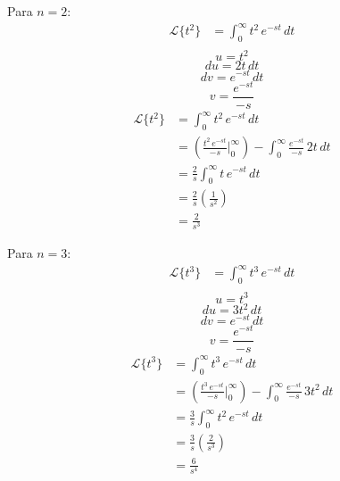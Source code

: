 Para $n=2$:
\begin{equation*}
\begin{split}
    \mathcal{L}\{t^2\}
        &=\int_0^{\infty}t^2\,e^{-st}\,dt\\
\end{split}
\end{equation*}
\begin{equation*}
    u=t^2
\end{equation*}
\begin{equation*}
    du=2t\,dt
\end{equation*}
\begin{equation*}
    dv=e^{-st}\,dt
\end{equation*}
\begin{equation*}
    v=\frac{e^{-st}}{-s}
\end{equation*}
\begin{equation*}
\begin{split}
    \mathcal{L}\{t^2\}
        &=\int_0^{\infty}t^2\,e^{-st}\,dt\\
        &=\left(\frac{t^2\,e^{-st}}{-s}\Biggr|_0^{\infty}\right)
        -\int_0^{\infty}\frac{e^{-st}}{-s}\,2t\,dt\\
        &=\frac{2}{s}\int_0^{\infty}t\,e^{-st}\,dt\\
        &=\frac{2}{s}\left(\frac{1}{s^2}\right)\\
        &=\frac{2}{s^3}
\end{split}
\end{equation*}

Para $n=3$:
\begin{equation*}
\begin{split}
    \mathcal{L}\{t^3\}
        &=\int_0^{\infty}t^3\,e^{-st}\,dt\\
\end{split}
\end{equation*}
\begin{equation*}
    u=t^3
\end{equation*}
\begin{equation*}
    du=3t^2\,dt
\end{equation*}
\begin{equation*}
    dv=e^{-st}\,dt
\end{equation*}
\begin{equation*}
    v=\frac{e^{-st}}{-s}
\end{equation*}
\begin{equation*}
\begin{split}
    \mathcal{L}\{t^3\}
        &=\int_0^{\infty}t^3\,e^{-st}\,dt\\
        &=\left(\frac{t^3\,e^{-st}}{-s}\Biggr|_0^{\infty}\right)
        -\int_0^{\infty}\frac{e^{-st}}{-s}\,3t^2\,dt\\
        &=\frac{3}{s}\int_0^{\infty}t^2\,e^{-st}\,dt\\
        &=\frac{3}{s}\left(\frac{2}{s^3}\right)\\
        &=\frac{6}{s^4}
\end{split}
\end{equation*}

